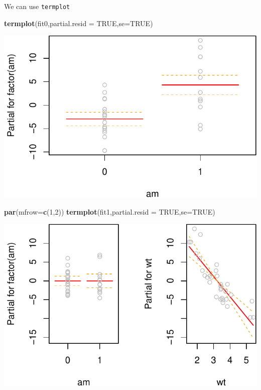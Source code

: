 \documentclass[]{article}
\newenvironment{Shaded}{\begin{snugshade}}{\end{snugshade}}
\newcommand{\KeywordTok}[1]{\textcolor[rgb]{0.13,0.29,0.53}{\textbf{{#1}}}}
\newcommand{\DataTypeTok}[1]{\textcolor[rgb]{0.13,0.29,0.53}{{#1}}}
\newcommand{\DecValTok}[1]{\textcolor[rgb]{0.00,0.00,0.81}{{#1}}}
\newcommand{\OtherTok}[1]{\textcolor[rgb]{0.56,0.35,0.01}{{#1}}}
\newcommand{\NormalTok}[1]{{#1}}
\numberwithin{equation}{section}
\begin{document}
We can use \texttt{termplot}

\begin{Shaded}
\begin{Highlighting}[]
\KeywordTok{termplot}\NormalTok{(fit0,}\DataTypeTok{partial.resid =} \OtherTok{TRUE}\NormalTok{,}\DataTypeTok{se=}\OtherTok{TRUE}\NormalTok{)}
\end{Highlighting}
\end{Shaded}

\includegraphics{index_files/figure-latex/unnamed-chunk-219-1.pdf}

\begin{Shaded}
\begin{Highlighting}[]
\KeywordTok{par}\NormalTok{(}\DataTypeTok{mfrow=}\KeywordTok{c}\NormalTok{(}\DecValTok{1}\NormalTok{,}\DecValTok{2}\NormalTok{))}
\KeywordTok{termplot}\NormalTok{(fit1,}\DataTypeTok{partial.resid =} \OtherTok{TRUE}\NormalTok{,}\DataTypeTok{se=}\OtherTok{TRUE}\NormalTok{)}
\end{Highlighting}
\end{Shaded}

\includegraphics{index_files/figure-latex/unnamed-chunk-220-1.pdf}
\end{document}
